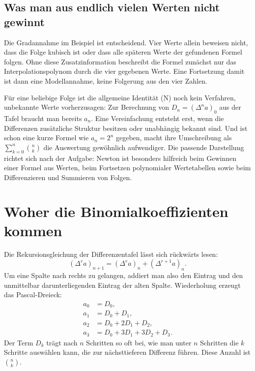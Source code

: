 \subsection*{Was man aus endlich vielen Werten nicht gewinnt}

Die Gradannahme im Beispiel ist entscheidend. Vier Werte allein
beweisen nicht, dass die Folge kubisch ist oder dass alle späteren
Werte der gefundenen Formel folgen. Ohne diese Zusatzinformation
beschreibt die Formel zunächst nur das Interpolationspolynom durch
die vier gegebenen Werte. Eine Fortsetzung damit ist dann eine
Modellannahme, keine Folgerung aus den vier Zahlen.

Für eine beliebige Folge ist die allgemeine Identität (N) noch kein
Verfahren, unbekannte Werte vorherzusagen: Zur Berechnung von
$D_n=(\Delta^na)_0$ aus der Tafel braucht man bereits $a_n$.
Eine Vereinfachung entsteht erst, wenn die Differenzen zusätzliche
Struktur besitzen oder unabhängig bekannt sind. Und ist schon eine
kurze Formel wie $a_n=2^n$ gegeben, macht ihre Umschreibung als
$\sum_{k=0}^n\binom nk$ die Auswertung gewöhnlich aufwendiger.
Die passende Darstellung richtet sich nach der Aufgabe: Newton ist
besonders hilfreich beim Gewinnen einer Formel aus Werten, beim
Fortsetzen polynomialer Wertetabellen sowie beim Differenzieren und
Summieren von Folgen.

\section{Woher die Binomialkoeffizienten kommen}

Die Rekursionsgleichung der Differenzentafel lässt sich rückwärts lesen:
\begin{equation}\tag{R}\label{newton:reconstruction}
 (\Delta^ra)_{n+1}=(\Delta^ra)_n+(\Delta^{r+1}a)_n.
\end{equation}
Um eine Spalte nach rechts zu gelangen, addiert man also den Eintrag
und den unmittelbar darunterliegenden Eintrag der alten Spalte.
Wiederholung erzeugt das Pascal-Dreieck:
\[
 \begin{aligned}
 a_0&=D_0,\\
 a_1&=D_0+D_1,\\
 a_2&=D_0+2D_1+D_2,\\
 a_3&=D_0+3D_1+3D_2+D_3.
 \end{aligned}
\]
Der Term $D_k$ trägt nach $n$ Schritten so oft bei, wie man unter
$n$ Schritten die $k$ Schritte auswählen kann, die zur nächsttieferen
Differenz führen. Diese Anzahl ist $\binom nk$.

